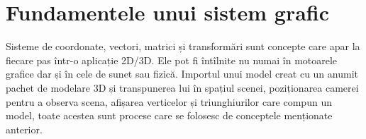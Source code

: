 \chapter{Fundamentele unui sistem grafic}
\label{ch1}

Sisteme de coordonate, vectori, matrici și transformări sunt concepte care apar
la fiecare pas într-o aplicație 2D/3D. Ele pot fi întîlnite nu numai în
motoarele grafice dar și în cele de sunet sau fizică. Importul unui model creat
cu un anumit pachet de modelare 3D și transpunerea lui în spațiul scenei, 
poziționarea camerei pentru a observa scena, afișarea verticelor și
triunghiurilor care compun un model, toate acestea sunt procese care se 
folosesc de conceptele menționate anterior.

